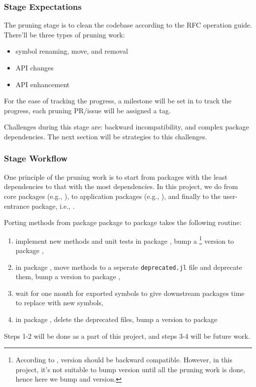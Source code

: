 \subsubsection*{Stage Expectations}

The pruning stage is to clean the codebase according to the RFC operation guide. There'll be three types of pruning work:
\begin{itemize}
    \item symbol renaming, move, and removal
    \item API changes
    \item API enhancement
\end{itemize}
For the ease of tracking the progress, a milestone will be set in \repoimages{} to track the progress, each pruning PR/issue will be assigned a tag. \par

Challenges during this stage are: backward incompatibility, and complex package dependencies. The next section will be strategies to this challenges. \par

\subsubsection*{Stage Workflow}

One principle of the pruning work is to start from packages with the least dependencies to that with the most dependencies. In this project, we do from core packages (e.g., \repoimagecore{}), to application packages (e.g., \repoimagetransformations{}), and finally to the user-entrance package, i.e., \repoimages{}.\par


\newcommand{\packageA}{package \sname{A}\xspace}
\newcommand{\packageB}{package \xspace}

Porting methods from package \packageA to \packageB takes the following routine:
\begin{enumerate}
    \item implement new methods and unit tests in \packageB, bump a \footnote{According to \semanticversion{},  version should be backward compatible. However, in this project, it's not suitable to bump  version until all the pruning work is done, hence here we bump  and  version.} version to \packageB,
    \item in \packageA, move methods to a seperate \texttt{deprecated.jl} file and deprecate them, bump a  version to \packageA,
    \item wait for one month for exported symbols to give downstream packages time to replace with new symbols,
    \item in \packageA, delete the deprecated files, bump a  version to \packageA
\end{enumerate}
Steps 1-2 will be done as a part of this project, and steps 3-4 will be future work.


